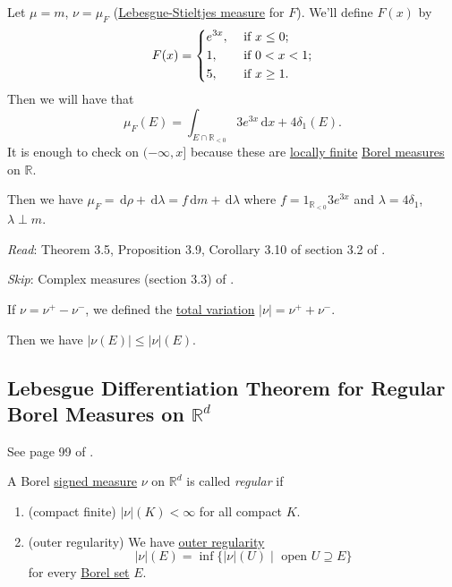 \begin{eg}
	Let \(\mu = m\), \(\nu = \mu_F\) (\hyperref[def:Lebesgue-Stieltjes-measure]{Lebesgue-Stieltjes measure} for \(F\)). We'll define \(F(x)\) by
	\[
		F(x) = \begin{dcases}
			e^{3x}, & \text{ if } x\leq 0 ;   \\
			1,      & \text{ if } 0 < x < 1 ; \\
			5,      & \text{ if } x \geq 1 .
		\end{dcases}
	\]
	Then we will have that
	\[
		\mu_F(E) = \int_{E \cap \mathbb{R}_{< 0}} 3e^{3x} \,\mathrm{d}x + 4 \delta_1(E).
	\]
	It is enough to check on \((-\infty,x]\) because these are \hyperref[def:locally-finite]{locally finite} \hyperref[def:Borel-measure]{Borel measures} on \(\mathbb{R}\).

	Then we have \(\mu_F = \,\mathrm{d}\rho + \,\mathrm{d}\lambda = f\,\mathrm{d}m + \,\mathrm{d}\lambda\) where \(f = 1_{\mathbb{R}_{< 0}}3e^{3x}\) and \(\lambda = 4\delta_1\),
	\(\lambda \perp m\).
\end{eg}

\emph{Read}: Theorem 3.5, Proposition 3.9, Corollary 3.10 of section 3.2 of \cite{folland1999real}.

\emph{Skip}: Complex measures (section 3.3) of \cite{folland1999real}.

\begin{prev}
	If \(\nu = \nu^+ - \nu^-\), we defined the \hyperref[def:total-variation]{total variation} \(\left\vert \nu \right\vert = \nu^+ + \nu^-\).

	Then we have \(\left\vert \nu(E) \right\vert \leq \left\vert \nu \right\vert(E)\).
\end{prev}

\subsection{Lebesgue Differentiation Theorem for Regular Borel Measures on \(\mathbb{R} ^d\)}
See page 99 of \cite{folland1999real}.
\begin{definition}[Regular]\label{def:regular}
	A Borel \hyperref[def:signed-measure]{signed measure} \(\nu\) on \(\mathbb{R}^d\) is called \emph{regular} if
	\begin{enumerate}
		\item\label{def:regular-compact-finite} (compact finite) \(\left\vert \nu \right\vert(K) < \infty\) for all compact \(K\).
		\item\label{def:regular-outer-regularity} (outer regularity) We have \hyperref[thm:regularity]{outer regularity}
		\[
			\left\vert \nu \right\vert(E) = \inf\{\left\vert \nu \right\vert(U) \mid \text{ open } U \supseteq E\}
		\]
		for every \hyperref[def:Borel-set]{Borel set} \(E\).
	\end{enumerate}
\end{definition}

